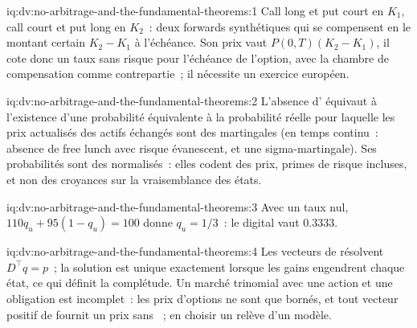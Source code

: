 \begin{solution}{iq:dv:no-arbitrage-and-the-fundamental-theorems:1}
Call long et put court en $K_1$, call court et put long en $K_2$~: deux
forwards synthétiques qui se compensent en le montant certain $K_2-K_1$ à l'échéance. Son prix vaut
$P(0,T)(K_2-K_1)$, il cote donc un taux sans risque pour l'échéance de l'option, avec la
chambre de compensation comme contrepartie~; il nécessite un exercice européen.
\end{solution}

\begin{solution}{iq:dv:no-arbitrage-and-the-fundamental-theorems:2}
L'absence d' équivaut à l'existence d'une probabilité équivalente à la probabilité réelle
pour laquelle les prix actualisés des actifs échangés sont des martingales (en temps continu~:
absence de free lunch avec risque évanescent, et une sigma-martingale). Ses probabilités sont
des  normalisés~: elles codent des prix, primes de risque incluses, et non des croyances
sur la vraisemblance des états.
\end{solution}

\begin{solution}{iq:dv:no-arbitrage-and-the-fundamental-theorems:3}
Avec un taux nul, $110q_u+95(1-q_u)=100$ donne $q_u=1/3$~: le digital vaut 0.3333.
\end{solution}

\begin{solution}{iq:dv:no-arbitrage-and-the-fundamental-theorems:4}
Les vecteurs de  résolvent $D^\top q=p$~; la solution est unique exactement lorsque les
gains engendrent chaque état, ce qui définit la complétude. Un marché trinomial avec une action
et une obligation est incomplet~: les prix d'options ne sont que bornés, et tout vecteur positif
de  fournit un prix sans ~; en choisir un relève d'un modèle.
\end{solution}

